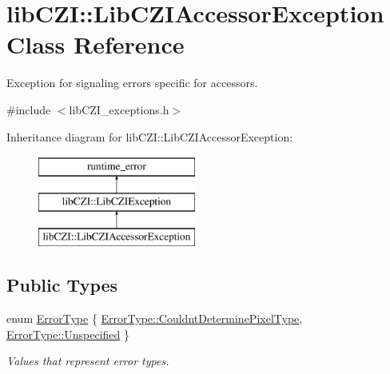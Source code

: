 \hypertarget{classlib_c_z_i_1_1_lib_c_z_i_accessor_exception}{}\section{lib\+C\+ZI\+:\+:Lib\+C\+Z\+I\+Accessor\+Exception Class Reference}
\label{classlib_c_z_i_1_1_lib_c_z_i_accessor_exception}


Exception for signaling errors specific for accessors.  




{\ttfamily \#include $<$lib\+C\+Z\+I\+\_\+exceptions.\+h$>$}

Inheritance diagram for lib\+C\+ZI\+:\+:Lib\+C\+Z\+I\+Accessor\+Exception\+:\begin{figure}[H]
\begin{center}
\leavevmode
\includegraphics[height=3.000000cm]{classlib_c_z_i_1_1_lib_c_z_i_accessor_exception}
\end{center}
\end{figure}
\subsection*{Public Types}
\begin{DoxyCompactItemize}
\item 
enum \hyperlink{classlib_c_z_i_1_1_lib_c_z_i_accessor_exception_afac26a03ad8be1d8314911a58b9b08b5}{Error\+Type} \{ \hyperlink{classlib_c_z_i_1_1_lib_c_z_i_accessor_exception_afac26a03ad8be1d8314911a58b9b08b5ab9a3da346ec292af4ab30323d51475a7}{Error\+Type\+::\+Couldnt\+Determine\+Pixel\+Type}, 
\hyperlink{classlib_c_z_i_1_1_lib_c_z_i_accessor_exception_afac26a03ad8be1d8314911a58b9b08b5a6fcdc090caeade09d0efd6253932b6f5}{Error\+Type\+::\+Unspecified}
 \}\begin{DoxyCompactList}\small\item\em Values that represent error types. \end{DoxyCompactList}
\end{DoxyCompactItemize}
